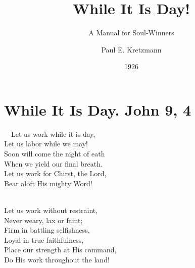 \documentclass[
]{book}
\title{While It Is Day!}
\subtitle{A Manual for Soul-Winners}
\author{Paul E. Kretzmann}
\date{1926}
\begin{document}
\maketitle

{
\setcounter{tocdepth}{1}
\tableofcontents
}
\setlength\parindent{1em}

\chapter*{While It Is Day. John 9, 4}\label{while-it-is-day.-john-9-4}

~~Let us work while it is day,\\
\hspace*{0.333em}\hspace*{0.333em}Let us labor while we may!\\
\hspace*{0.333em}\hspace*{0.333em}Soon will come the night of eath\\
\hspace*{0.333em}\hspace*{0.333em}When we yield our final breath.\\
\hspace*{0.333em}\hspace*{0.333em}Let us work for Chirst, the Lord,\\
\hspace*{0.333em}\hspace*{0.333em}Bear aloft His mighty Word!\\
\strut \\
\hspace*{0.333em}\hspace*{0.333em}Let us work without restraint,\\
\hspace*{0.333em}\hspace*{0.333em}Never weary, lax or faint;\\
\hspace*{0.333em}\hspace*{0.333em}Firm in battling selfishness,\\
\hspace*{0.333em}\hspace*{0.333em}Loyal in true faithfulness,\\
\hspace*{0.333em}\hspace*{0.333em}Place our strength at His command,\\
\hspace*{0.333em}\hspace*{0.333em}Do His work throughout the land!\\
\end{document}
